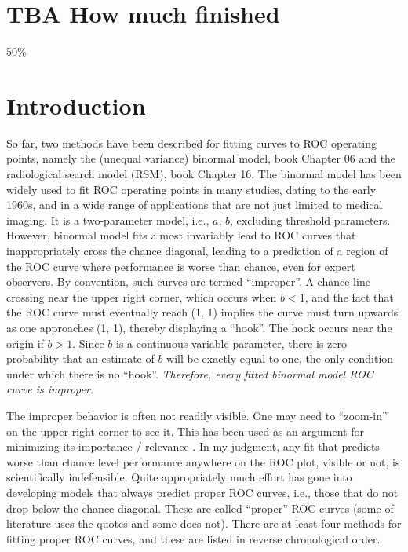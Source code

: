\documentclass[
]{book}
\begin{document}
\hypertarget{proper-roc-models-how-much-finished}{%
\section{TBA How much finished}\label{proper-roc-models-how-much-finished}}

50\%

\hypertarget{proper-roc-models-introduction}{%
\section{Introduction}\label{proper-roc-models-introduction}}

So far, two methods have been described for fitting curves to ROC operating points, namely the (unequal variance) binormal model, book Chapter 06 and the radiological search model (RSM), book Chapter 16. The binormal model has been widely used to fit ROC operating points in many studies, dating to the early 1960s, and in a wide range of applications that are not just limited to medical imaging. It is a two-parameter model, i.e., \(a\), \(b\), excluding threshold parameters. However, binormal model fits almost invariably lead to ROC curves that inappropriately cross the chance diagonal, leading to a prediction of a region of the ROC curve where performance is worse than chance, even for expert observers. By convention, such curves are termed ``improper''. A chance line crossing near the upper right corner, which occurs when \(b < 1\), and the fact that the ROC curve must eventually reach (1, 1) implies the curve must turn upwards as one approaches (1, 1), thereby displaying a ``hook''. The hook occurs near the origin if \(b > 1\). Since \(b\) is a continuous-variable parameter, there is zero probability that an estimate of \(b\) will be exactly equal to one, the only condition under which there is no ``hook''. \emph{Therefore, every fitted binormal model ROC curve is improper.}

The improper behavior is often not readily visible. One may need to ``zoom-in'' on the upper-right corner to see it. This has been used as an argument for minimizing its importance / relevance \citep{metz1978rocmethodology}. In my judgment, any fit that predicts worse than chance level performance anywhere on the ROC plot, visible or not, is scientifically indefensible. Quite appropriately much effort has gone into developing models that always predict proper ROC curves, i.e., those that do not drop below the chance diagonal. These are called ``proper'' ROC curves (some of literature uses the quotes and some does not). There are at least four methods for fitting proper ROC curves, and these are listed in reverse chronological order.
\end{document}
